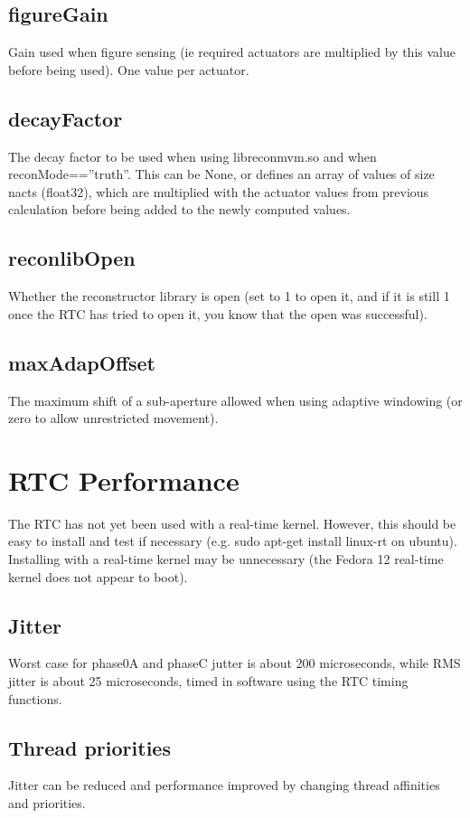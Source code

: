 \documentclass[a4,10pt]{article}
\begin{document}
\subsection{figureGain}
Gain used when figure sensing (ie required actuators are multiplied by
this value before being used).  One value per actuator.

\subsection{decayFactor}
The decay factor to be used when using libreconmvm.so and when
reconMode==''truth''.  This can be None, or defines an array of values
of size nacts (float32), which are multiplied with the actuator values from
previous calculation before being added to the newly computed values.

\subsection{reconlibOpen}
Whether the reconstructor library is open (set to 1 to open it, and if
it is still 1 once the RTC has tried to open it, you know that the
open was successful).

\subsection{maxAdapOffset}
The maximum shift of a sub-aperture allowed when using adaptive
windowing (or zero to allow unrestricted movement).

\section{RTC Performance}
The RTC has not yet been used with a real-time kernel.  However, this
should be easy to install and test if necessary (e.g. sudo apt-get
install linux-rt on ubuntu).  Installing with a real-time kernel may
be unnecessary (the Fedora 12 real-time kernel does not appear to boot).

\subsection{Jitter}
Worst case for phase0A and phaseC jutter is about 200 microseconds,
while RMS jitter is about 25 microseconds, timed in software using the
RTC timing functions.

\subsection{Thread priorities}
Jitter can be reduced and performance improved by changing thread
affinities and priorities.
\end{document}
